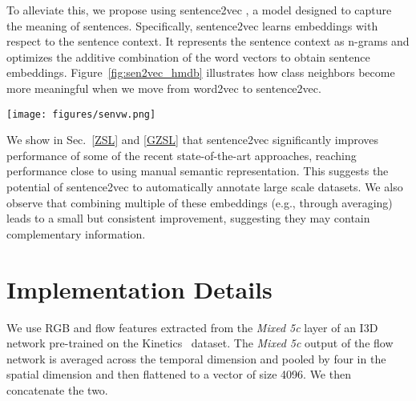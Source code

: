 \documentclass[runningheads]{llncs}
\begin{document}
To alleviate this, we propose using sentence2vec \cite{sentence2vec}, a model designed to capture the meaning of sentences. Specifically, sentence2vec learns embeddings with respect to the sentence context. It represents the sentence context as n-grams and optimizes the additive combination of the word vectors to obtain sentence embeddings. Figure~\ref{fig:sen2vec_hmdb} illustrates how class neighbors become more meaningful when we move from word2vec to sentence2vec.


\begin{figure*}[t]
    \centering
    \texttt{[image: figures/senvw.png]}
    \caption{\textbf{HMDB51} (a) Averaging word embeddings can produce poor results in certain cases. For example the nearest neighbor of ``shoot ball" is ``shoot gun", and of ``sit up" is ``sit down" which are not necessarily meaningful (b) Sentence2vec better captures phrase meanings: Nearest neighbors to ``sit up" is now ``push up", and for ``shoot ball", is golf. \textbf{UCF101} (c) The same effect is observed, where after averaging word2vec representations, the nearest neighbor of ``pommel horse" is "horse riding" (d) Sentence2vec helps capture phrase meanings: the while nearest neighbor of ``pommel horse" is now ``balance beam". The circles contain the nearest neighbor to the given unseen class and is for illustration purposes.}
    \label{fig:sen2vec_hmdb}
\end{figure*}


We show in Sec.~\ref{ZSL} and \ref{GZSL} that sentence2vec significantly improves performance of some of the recent state-of-the-art approaches, reaching performance close to using manual semantic representation. This suggests the potential of sentence2vec to automatically annotate large scale datasets. We also observe that combining multiple of these embeddings (e.g., through averaging) leads to a small but consistent improvement, suggesting they may contain complementary information. 



\fi

\section{Implementation Details} 
\label{subsec:implementation}

 We use RGB and flow features extracted from the \textit{Mixed 5c} layer of an I3D network pre-trained on the Kinetics~\cite{i3d} dataset. The \textit{Mixed 5c} output of the flow network is averaged across the temporal dimension and pooled by four in the spatial dimension and then flattened to a vector of size 4096. We then concatenate the two. \\
\end{document}
